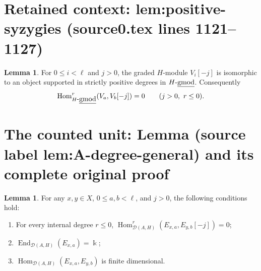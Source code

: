 \documentclass[10pt,a4paper]{amsart}
\newcommand{\Der}{\mathcal{D}}
\newcommand{\End}{\operatorname{End}}
\newcommand{\Hom}{\operatorname{Hom}}
\newcommand{\kk}{\Bbbk}
\def\udgmod{\mbox{-\underline{gmod}}}
\theoremstyle{definition}
\newtheorem{lem}[thm]{Lemma}
\begin{document}
\section*{Retained context: lem:positive-syzygies (source0.tex lines 1121--1127)}

\begin{lem}\label{lem:positive-syzygies}
For $0\le i<\ell$ and $j>0$, the graded $H$-module $V_i[-j]$ is isomorphic to an object supported in strictly positive degrees in $H\udgmod$.  Consequently
\begin{equation}\label{eq:H-positive-bound}
\Hom_{H\udgmod}^{r}(V_a,V_b[-j])=0
\qquad(j>0,\ r\le0).
\end{equation}
\end{lem}


\section{The counted unit: Lemma (source label lem:A-degree-general) and its complete original proof}

\begin{lem}\label{lem:A-degree-general}
For any $x,y\in X$, $0\le a,b<\ell$, and $j>0$, the following conditions hold:
\begin{enumerate}
\item[(i)] For every internal degree $r\le0$,
$\Hom_{\Der(A,H)}^r(E_{x,a},E_{y,b}[-j])=0$;
\item[(ii)] $\End_{\Der(A,H)}(E_{x,a})=\kk$;
\item[(iii)] $\Hom_{\Der(A,H)}(E_{x,a},E_{y,b})$ is finite dimensional.
\end{enumerate}
\end{lem}
\end{document}
